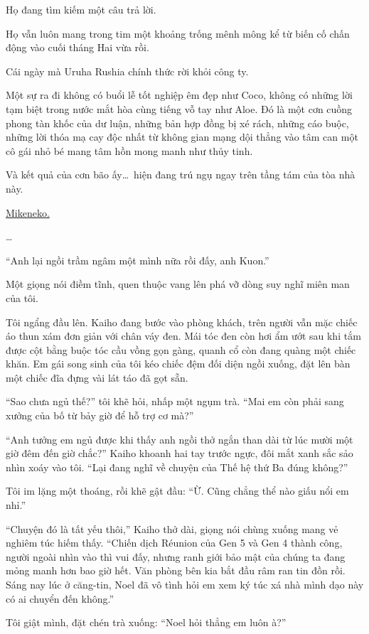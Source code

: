 \documentclass[../main.tex]{subfiles}
\begin{document}
Họ đang tìm kiếm một câu trả lời.

Họ vẫn luôn mang trong tim một khoảng trống mênh mông kể từ biến cố chấn động vào cuối tháng Hai vừa rồi.

Cái ngày mà Uruha Rushia chính thức rời khỏi công ty.

Một sự ra đi không có buổi lễ tốt nghiệp êm đẹp như Coco, không có những lời tạm biệt trong nước mắt hòa cùng tiếng vỗ tay như Aloe. Đó là một cơn cuồng phong tàn khốc của dư luận, những bản hợp đồng bị xé rách, những cáo buộc, những lời thóa mạ cay độc nhất từ không gian mạng dội thẳng vào tâm can một cô gái nhỏ bé mang tâm hồn mong manh như thủy tinh.

Và kết quả của cơn bão ấy\dots\ hiện đang trú ngụ ngay trên tầng tám của tòa nhà này.

\uline{Mikeneko.}

\dots

``Anh lại ngồi trầm ngâm một mình nữa rồi đấy, anh Kuon.''

Một giọng nói điềm tĩnh, quen thuộc vang lên phá vỡ dòng suy nghĩ miên man của tôi.

Tôi ngẩng đầu lên. Kaiho đang bước vào phòng khách, trên người vẫn mặc chiếc áo thun xám đơn giản với chân váy đen. Mái tóc đen còn hơi ẩm ướt sau khi tắm được cột bằng buộc tóc cầu vồng gọn gàng, quanh cổ còn đang quàng một chiếc khăn. Em gái song sinh của tôi kéo chiếc đệm đối diện ngồi xuống, đặt lên bàn một chiếc đĩa đựng vài lát táo đã gọt sẵn.

``Sao chưa ngủ thế?'' tôi khẽ hỏi, nhấp một ngụm trà. ``Mai em còn phải sang xưởng của bố từ bảy giờ để hỗ trợ cơ mà?''

``Anh tưởng em ngủ được khi thấy anh ngồi thở ngắn than dài từ lúc mười một giờ đêm đến giờ chắc?'' Kaiho khoanh hai tay trước ngực, đôi mắt xanh sắc sảo nhìn xoáy vào tôi. ``Lại đang nghĩ về chuyện của Thế hệ thứ Ba đúng không?''

Tôi im lặng một thoáng, rồi khẽ gật đầu: ``Ừ. Cũng chẳng thể nào giấu nổi em nhỉ.''

``Chuyện đó là tất yếu thôi,'' Kaiho thở dài, giọng nói chùng xuống mang vẻ nghiêm túc hiếm thấy. ``Chiến dịch Réunion của Gen 5 và Gen 4 thành công, người ngoài nhìn vào thì vui đấy, nhưng ranh giới bảo mật của chúng ta đang mỏng manh hơn bao giờ hết. Văn phòng bên kia bắt đầu râm ran tin đồn rồi. Sáng nay lúc ở căng-tin, Noel đã vô tình hỏi em xem ký túc xá nhà mình dạo này có ai chuyển đến không.''

Tôi giật mình, đặt chén trà xuống: ``Noel hỏi thẳng em luôn à?''
\end{document}
